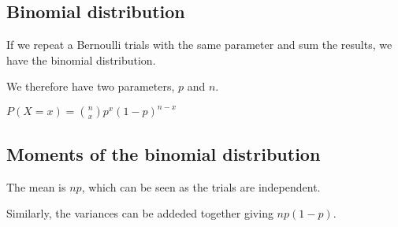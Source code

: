 
\subsection{Binomial distribution}

If we repeat a Bernoulli trials with the same parameter and sum the results, we have the binomial distribution.

We therefore have two parameters, \(p\) and \(n\).

\(P(X=x)={n\choose x }p^x(1-p)^{n-x}\)

\subsection{Moments of the binomial distribution}

The mean is \(np\), which can be seen as the trials are independent.

Similarly, the variances can be addeded together giving \(np(1-p)\).

